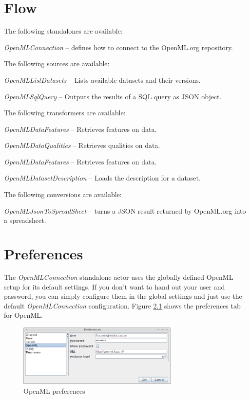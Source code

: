 \documentclass[a4paper]{book}
\begin{document}
\chapter{Flow}
The following standalones are available:
\begin{tight_itemize}
	\item \textit{OpenMLConnection} -- defines how to connect to the OpenML.org repository.
\end{tight_itemize}
The following sources are available:
\begin{tight_itemize}
	\item \textit{OpenMLListDatasets} -- Lists available datasets and their versions.
	\item \textit{OpenMLSqlQuery} -- Outputs the results of a SQL query as JSON object.
\end{tight_itemize}
The following transformers are available:
\begin{tight_itemize}
	\item \textit{OpenMLDataFeatures} -- Retrieves features on data.
	\item \textit{OpenMLDataQualities} -- Retrieves qualities on data.
	\item \textit{OpenMLDataFeatures} -- Retrieves features on data.
	\item \textit{OpenMLDatasetDescription} -- Loads the description for a dataset.
\end{tight_itemize}
The following conversions are available:
\begin{tight_itemize}
	\item \textit{OpenMLJsonToSpreadSheet} -- turns a JSON result returned by OpenML.org 
	into a spreadsheet.
\end{tight_itemize}

\chapter{Preferences}
\label{preferences}
The \textit{OpenMLConnection} standalone actor uses the globally defined
OpenML setup for its default settings. If you don't want to hand out your
user and password, you can simply configure them in the global
settings and just use the default \textit{OpenMLConnection} configuration.
Figure \ref{openml_preferences} shows the preferences tab for OpenML.
\begin{figure}[htb]
  \centering
  \includegraphics[width=8.0cm]{images/openml_preferences.png}
  \caption{OpenML preferences}
  \label{openml_preferences}
\end{figure}


\end{document}
